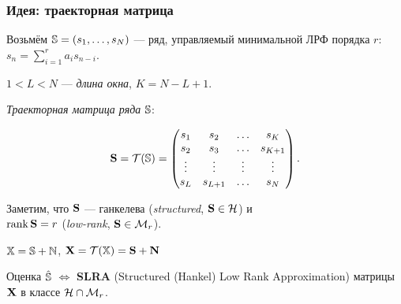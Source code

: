 \documentclass[unicode, notheorems]{beamer}
\newtheorem{definition}{Определение}
\DeclareMathOperator{\rank}{rank}
\begin{document}
\begin{frame}
	\frametitle{Идея: траекторная матрица}
	Возьмём $\mathbb{S} = (s_1, \ldots, s_N)$ --- ряд, управляемый минимальной ЛРФ порядка $r$: $ s_n = \sum_{i = 1}^{r} a_i s_{n-i}$.
	
	$1 < L < N$ --- \emph{длина окна}, $K = N - L + 1$.
	
	\emph{Траекторная матрица ряда} $\mathbb{S}$:
	
	\begin{equation*}
	\mathbf{S} = \mathcal{T}(\mathbb{S}) = \begin{pmatrix}
	s_1 & s_2 & \ldots & s_K \\
	s_2 & s_3 & \ldots & s_{K + 1} \\
	\vdots & \vdots & \vdots & \vdots \\
	s_L & s_{L + 1} & \ldots & s_N
	\end{pmatrix}.
	\end{equation*}
	
	Заметим, что $\mathbf{S}$ --- ганкелева (\textit{structured}, $\mathbf{S} \in \mathcal{H}$) и \\ $\rank \bfS = r$ (\textit{low-rank}, $\mathbf{S} \in \mathcal{M}_r$). 
	
	$\mathbb{X} = \mathbb{S} + \mathbb{N}$, $\mathbf{X} = \mathcal{T}(\mathbb{X}) = \mathbf{S} + \mathbf{N}$
	
	Оценка $\hat {\mathbb{S}}$ $\Leftrightarrow$ \textbf{SLRA} (Structured (Hankel) Low Rank Approximation) матрицы $\mathbf{X}$ в классе $\mathcal{H} \cap \mathcal{M}_r$.
	
	
	
	
	
	
\end{frame}
\end{document}
